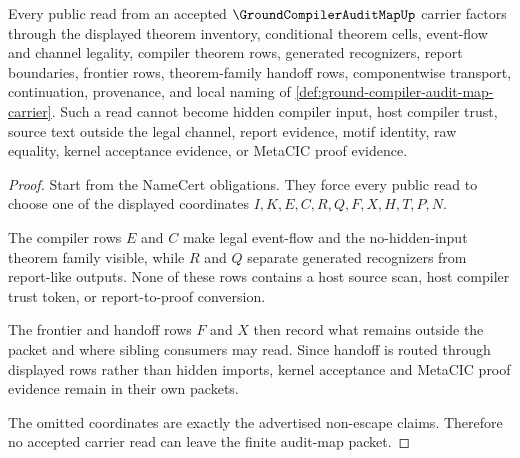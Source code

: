 \begin{theorem}
\label{thm:ground-compiler-audit-map-nonescape}
Every public read from an accepted $\GroundCompilerAuditMapUp$ carrier factors through the displayed theorem inventory, conditional theorem cells, event-flow and channel legality, compiler theorem rows, generated recognizers, report boundaries, frontier rows, theorem-family handoff rows, componentwise transport, continuation, provenance, and local naming of \autoref{def:ground-compiler-audit-map-carrier}. Such a read cannot become hidden compiler input, host compiler trust, source text outside the legal channel, report evidence, motif identity, raw equality, kernel acceptance evidence, or MetaCIC proof evidence.
\end{theorem}
\begin{proof}
Start from the NameCert obligations. They force every public read to choose one of the displayed coordinates $I,K,E,C,R,Q,F,X,H,T,P,N$.

The compiler rows $E$ and $C$ make legal event-flow and the no-hidden-input theorem family visible, while $R$ and $Q$ separate generated recognizers from report-like outputs. None of these rows contains a host source scan, host compiler trust token, or report-to-proof conversion.

The frontier and handoff rows $F$ and $X$ then record what remains outside the packet and where sibling consumers may read. Since handoff is routed through displayed rows rather than hidden imports, kernel acceptance and MetaCIC proof evidence remain in their own packets.

The omitted coordinates are exactly the advertised non-escape claims. Therefore no accepted carrier read can leave the finite audit-map packet.
\end{proof}

